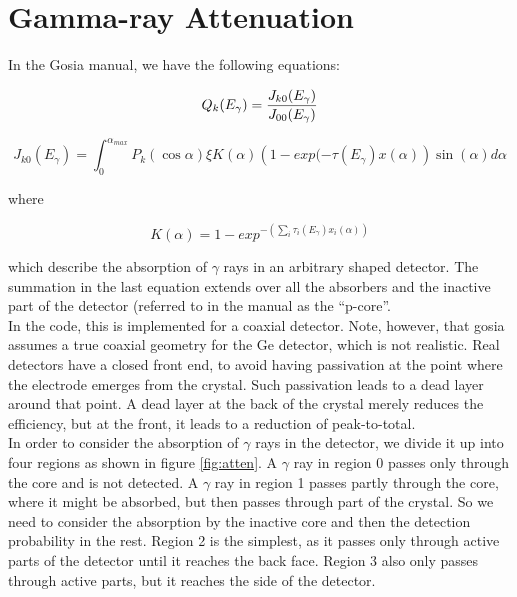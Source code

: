 \section{Gamma-ray Attenuation}

\noindent In the Gosia manual, we have the following equations:

\begin{equation}
Q_k(E_\gamma) = {J_{k0}(E_\gamma) \over J_{00}(E_\gamma)}
\end{equation}

\begin{equation}
J_{k0}(E_\gamma) =
\int_0^{\alpha_{max}}
P_k(\cos\alpha)
\xi
K(\alpha)
\left(1 - exp(-\tau(E_\gamma) x(\alpha)\right)
\sin(\alpha)
d\alpha
\label{eq:jk0}
\end{equation}

where

\begin{equation}
K(\alpha) = 1 - exp^{-
\left(\sum_i \tau_i(E_\gamma) x_i(\alpha)\right)
}
\end{equation}

\noindent which describe the absorption of $\gamma$ rays in an
arbitrary shaped detector. The summation in the last equation extends
over all the absorbers and the inactive part of the detector (referred
to in the manual as the ``p-core''.\\

\noindent In the code, this is implemented for a coaxial detector.
Note, however, that gosia assumes a true coaxial geometry for the Ge
detector, which is not realistic. Real detectors have a closed front
end, to avoid having passivation at the point where the electrode
emerges from the crystal. Such passivation leads to a dead layer
around that point. A dead layer at the back of the crystal merely
reduces the efficiency, but at the front, it leads to a reduction of
peak-to-total.\\

\noindent In order to consider the absorption of $\gamma$ rays in the
detector, we divide it up into four regions as shown in figure
\ref{fig:atten}. A $\gamma$ ray in region 0 passes only through the
core and is not detected. A $\gamma$ ray in region 1 passes partly
through the core, where it might be absorbed, but then passes through
part of the crystal. So we need to consider the absorption by the
inactive core and then the detection probability in the rest. Region 2
is the simplest, as it passes only through active parts of the
detector until it reaches the back face. Region 3 also only passes
through active parts, but it reaches the side of the detector.\\

